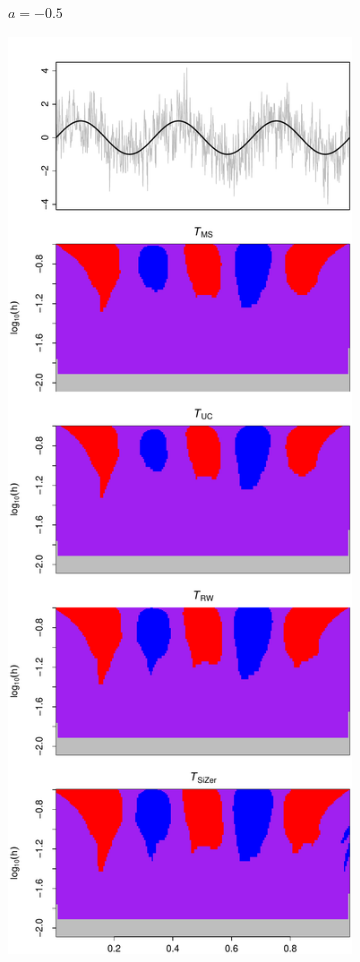 \begin{figure}[p]
\begin{subfigure}[b]{0.475\textwidth}
\caption{$a=-0.5$}
\end{subfigure}
\hspace{0.25cm}
\begin{subfigure}[b]{0.475\textwidth}
\includegraphics[width=\textwidth]{Plots/SiZermaps/SiZer_map_T_1000_sine_a1_50_seed_1.pdf}

\end{subfigure}
\end{figure}
